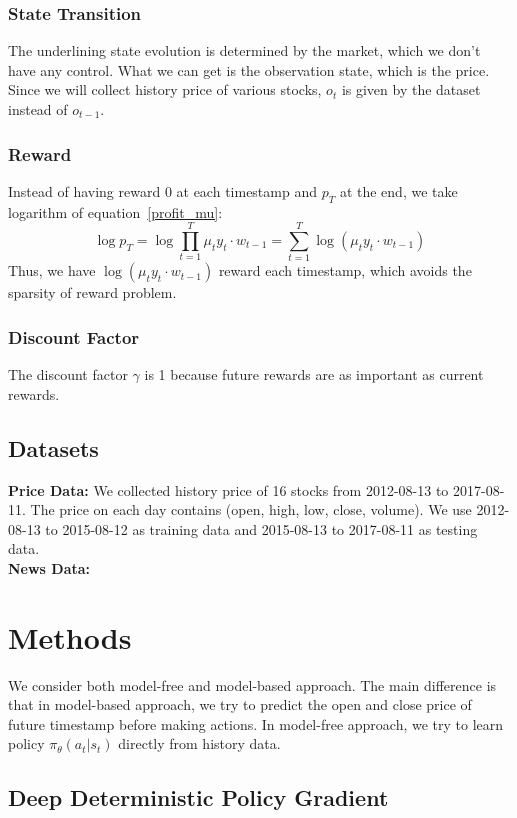 \documentclass[a4paper, 10pt]{article}
\begin{document}
\begin{spacing}{1.2}
    \subsubsection{State Transition}
    The underlining state evolution is determined by the market, which we don't have any control. What we can get is the observation state, which is the price. Since we will collect history price of various stocks, $o_t$ is given by the dataset instead of $o_{t-1}$.\\
    \subsubsection{Reward}
    Instead of having reward 0 at each timestamp and $p_T$ at the end, we take logarithm of equation~\ref{profit_mu}:
    \begin{equation}
    \log{p_T}=\log{\prod_{t=1}^{T}\mu_t y_t\cdot w_{t-1}}=\sum_{t=1}^{T}\log(\mu_t y_t\cdot w_{t-1})
    \end{equation}
    Thus, we have $\log(\mu_t y_t\cdot w_{t-1})$ reward each timestamp, which avoids the sparsity of reward problem.\\
    \subsubsection{Discount Factor}
    The discount factor $\gamma$ is 1 because future rewards are as important as current rewards.
    
    \subsection{Datasets}
    \textbf{Price Data:}
    We collected history price of 16 stocks from 2012-08-13 to 2017-08-11. The price on each day contains (open, high, low, close, volume). We use 2012-08-13 to 2015-08-12 as training data and 2015-08-13 to 2017-08-11 as testing data.\\
    \textbf{News Data:}
    
    \section{Methods}
    We consider both model-free and model-based approach. The main difference is that in model-based approach, we try to predict the open and close price of future timestamp before making actions. In model-free approach, we try to learn policy $\pi_{\theta}(a_t|s_t)$ directly from history data.
    \subsection{Deep Deterministic Policy Gradient}
    

\end{spacing}
\end{document}
